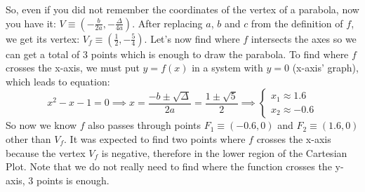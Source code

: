 So, even if you did not remember
the coordinates of the vertex
of a parabola, now you have
it: $V \equiv \left( -\frac{b}{2a}, - \frac{\Delta}{4a} \right)$.
After replacing
$a$, $b$ and $c$ from the definition of $f$, we get its vertex:
$V_f \equiv \left( \frac{1}{2}, - \frac{5}{4} \right)$.
Let's now find where $f$ intersects the axes so we can get a total of 3 points
which is enough to draw the parabola. To find where $f$ crosses the x-axis,
we must put $y = f(x)$ in a system with $y = 0$ (x-axis' graph), which leads to
equation:
\begin{equation*}
    x^2 - x - 1 = 0 \implies x = \frac{-b \pm \sqrt{\Delta}}{2a} =
    \frac{1 \pm \sqrt{5}}{2} \implies
    \begin{cases}
        x_1 \approx 1.6\\
        x_2 \approx -0.6
    \end{cases}
\end{equation*}
So now we know $f$ also passes through points $F_1 \equiv (-0.6,0)$ and
$F_2 \equiv (1.6,0)$ other than $V_f$. It was expected to find two points
where $f$ crosses the x-axis because the vertex $V_f$ is negative, therefore
in the lower region of the Cartesian Plot. Note that we do not really need
to find where the function crosses the y-axis, 3 points is
enough.

